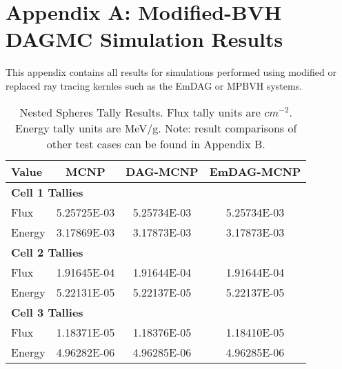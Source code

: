 
\chapter{Appendix A: Modified-BVH DAGMC Simulation Results}\label{ch:appendix_a}

This appendix contains all results for simulations performed using modified or
replaced ray tracing kernles such as the EmDAG or MPBVH systems.

\begin{table}[H]
  \small
  \begin{center}
    \begin{tabular}{lccc}
      \toprule
      Value & MCNP & DAG-MCNP & EmDAG-MCNP \\
      \toprule
      \multicolumn{4}{l}{\textbf{Cell 1 Tallies}} \\
      \hline
      Flux  & 5.25725E-03 & 5.25734E-03 & 5.25734E-03 \\
      Energy  & 3.17869E-03 &  3.17873E-03 &  3.17873E-03 \\
      \hline
      \multicolumn{4}{l}{\textbf{Cell 2 Tallies}} \\
      \hline
      Flux  & 1.91645E-04 & 1.91644E-04 & 1.91644E-04 \\
      Energy  & 5.22131E-05 & 5.22137E-05 & 5.22137E-05 \\
      \hline
      \multicolumn{4}{l}{\textbf{Cell 3 Tallies}} \\
      \hline
      Flux  & 1.18371E-05 & 1.18376E-05 & 1.18410E-05 \\
      Energy  & 4.96282E-06 & 4.96285E-06 & 4.96285E-06 \\
      \bottomrule
                        
    \end{tabular}
    \caption{Nested Spheres Tally Results. Flux tally units are
      $cm^{-2}$. Energy tally units are MeV/g. Note: result comparisons of other
      test cases can be found in Appendix B.}
    \label{nestedspheres}
  \end{center}
\end{table}


